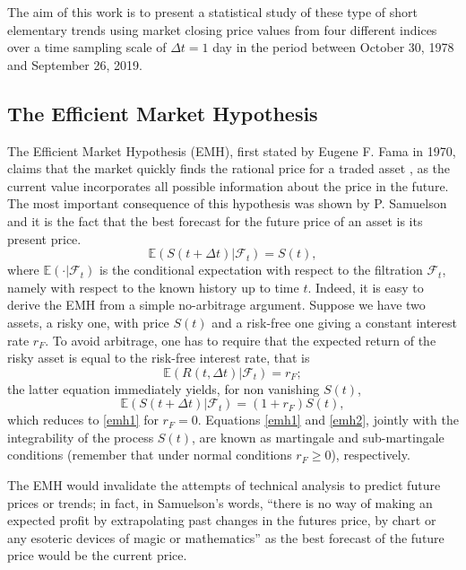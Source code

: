 \documentclass[a4paper]{jpconf}
\begin{document}
The aim of this work is to present a statistical study of these type of short elementary trends using market closing price values from four different indices over a time sampling scale of $\Delta t=1$ day in the period between October 30, 1978 and September 26, 2019.




\subsection{The Efficient Market Hypothesis}
\label{efficient}
The Efficient Market Hypothesis (EMH), first stated by Eugene F. Fama in 1970, claims that the market quickly finds the rational price for a traded asset \cite{Mantegna}, as the current value incorporates all possible information about the price in the future. The most important consequence of this hypothesis was shown by P. Samuelson \cite{Samuelson 2} and it is the fact that the best forecast for the future price of an asset is its present price.
\begin{equation}
\label{emh1}
\mathbb{E}(S(t+\Delta t)|\mathcal{F}_t ) = S(t),
\end{equation} 
where $\mathbb{E}(\cdot|\mathcal{F}_t)$ is the conditional expectation with respect to the filtration $\mathcal{F}_t$, namely with respect to the known history up to time $t$. Indeed, it is easy to derive the EMH from a simple no-arbitrage argument. Suppose we have two assets, a risky one, with price $S(t)$ and a risk-free one giving a constant interest rate $r_F$. To avoid arbitrage, one has to require that the expected return of the risky asset is equal to the risk-free interest rate, that is
\begin{equation}
\mathbb{E} (R(t, \Delta t)|\mathcal{F}_t) = r_F;
\end{equation}
the latter equation immediately yields, for non vanishing $S(t)$,
\begin{equation}
\label{emh2}
\mathbb{E}(S(t+\Delta t)|\mathcal{F}_t ) = (1+r_F) S(t),
\end{equation}
which reduces to \eqref{emh1} for $r_F = 0$. Equations \eqref{emh1} and
\eqref{emh2}, jointly with the integrability of the process $S(t)$, are known as martingale and sub-martingale conditions (remember that under normal conditions $r_F \geq 0$), respectively.

The EMH would invalidate the attempts of technical analysis to predict future prices or trends; in fact, in Samuelson's words, ``there is no way of making an expected profit by extrapolating past changes in the futures price, by chart or any esoteric devices of magic or mathematics'' \cite{Samuelson 2} as the best forecast of the future price would be the current price.
\end{document}
